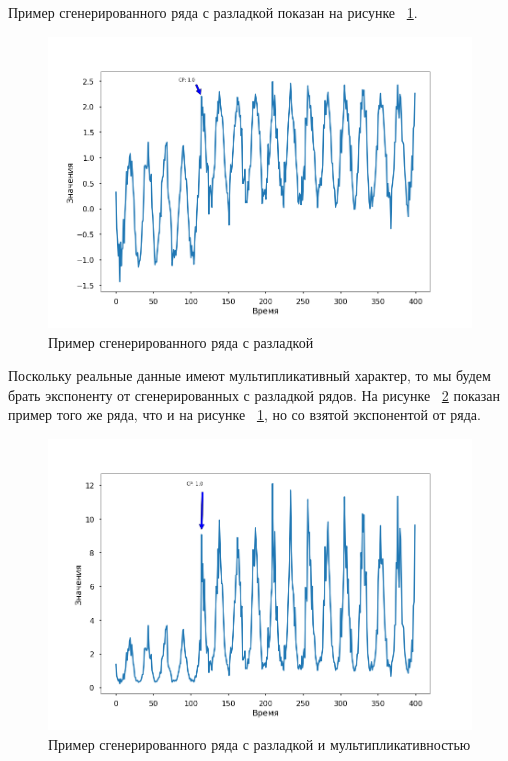 \documentclass[%
12pt,
master,  %
natbib,      %
subf,        %
substylefile = spbu.rtx,
href,        %
colorlinks,  %
]{disser}
\begin{document}
Пример сгенерированного ряда с разладкой показан на рисунке ~\ref{fig:data_modeling_example_2}.

\begin{figure}[!hhh]
	\begin{center}
		\includegraphics[width=12cm]{data_modeling_example_2}
	\end{center}
	\vspace{-5mm}\caption{Пример сгенерированного ряда с разладкой}
	\label{fig:data_modeling_example_2}
\end{figure}

 Поскольку реальные данные имеют мультипликативный характер, то мы будем брать экспоненту от сгенерированных с разладкой рядов. На рисунке ~\ref{fig:data_modeling_example_3} показан пример того же ряда, что и на рисунке ~\ref{fig:data_modeling_example_2}, но со взятой экспонентой от ряда.

 \begin{figure}[!hhh]
	\begin{center}
		\includegraphics[width=12cm]{data_modeling_example_3}
	\end{center}
	\vspace{-5mm}\caption{Пример сгенерированного ряда с разладкой и мультипликативностью}
	\label{fig:data_modeling_example_3}
\end{figure}
%
\end{document}
